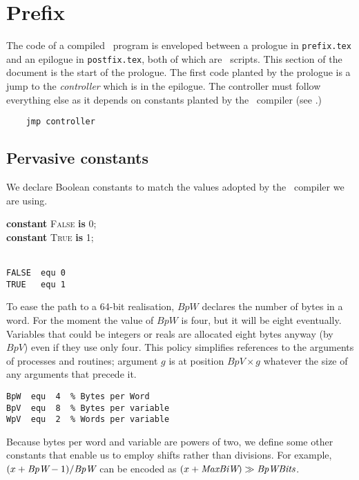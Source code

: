 \section{Prefix}\label{prefix}
The code of a compiled \desi\ program is enveloped between a prologue in \texttt{prefix.tex} and an epilogue in \texttt{postfix.tex}, both of which are \dvmasm\ scripts. This section of the document is the start of the prologue.
The first code planted by the prologue is a jump to the \emph{controller} which is in the epilogue. The controller must follow everything else as it depends on constants planted by the \jit\ compiler (see .)

{\small
\begin{verbatim}
    jmp controller
\end{verbatim}}



\subsection{Pervasive constants}
We declare Boolean constants to match the values adopted by the \cc\ compiler we are using.

\begin{tabbing}
\indents
\vb\>\textbf{constant} \textsc{False} \textbf{is} 0;\\
\vb\>\textbf{constant} \textsc{True} \textbf{is} 1;\\
\\[-30pt]
\end{tabbing}

{\small
\begin{verbatim}
FALSE  equ 0
TRUE   equ 1
\end{verbatim}}

To ease the path to a 64-bit realisation, $BpW$ declares the number of bytes in a word. For the moment the value of $BpW$ is four, but it will be eight eventually. Variables that could be integers or reals are allocated eight bytes anyway (by $BpV$) even if they use only four. This policy simplifies references to the arguments of processes and routines; argument $g$ is at position $BpV\!\times g$ whatever the size of any arguments that precede it.

{\small
\begin{verbatim}
BpW  equ  4  % Bytes per Word
BpV  equ  8  % Bytes per variable
WpV  equ  2  % Words per variable
\end{verbatim}}

Because bytes per word and variable are powers of two, we define some other constants that enable us to employ shifts rather than divisions. For example, $(x+\emph{BpW}-1)/\emph{BpW}$ can be encoded as $(x+\emph{MaxBiW})\gg \emph{BpWBits}$.

